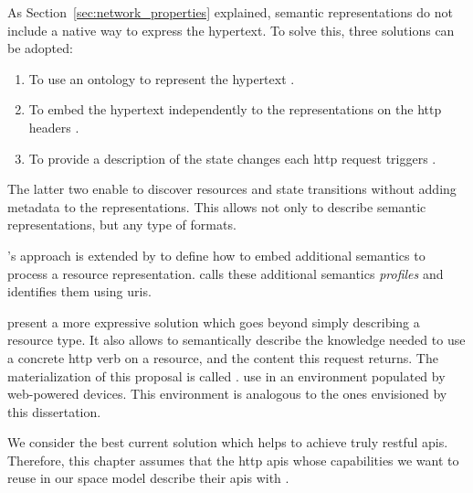 As Section~\ref{sec:network_properties} explained, semantic representations do not include a native way to express the hypertext. %
To solve this, three solutions can be adopted:
\begin{enumerate}
  \item To use an ontology to represent the hypertext \citep{kjernsmo_necessity_2012}.
  \item To embed the hypertext independently to the representations on the \ac{http} headers \citep{mark_web_2010}.
  \item To provide a description of the state changes each \ac{http} request triggers \citep{verborgh_functional_2012,verborgh_ijcs_2014}.
\end{enumerate}


The latter two enable to discover resources and state transitions without adding metadata to the representations.
This allows not only to describe semantic representations, but any type of formats.


\citeauthor{mark_web_2010}'s \citep{mark_web_2010} approach is extended by \citet{erik_profile_2013} to define how to embed additional semantics to process a resource representation.
\citet{erik_profile_2013} calls these additional semantics \emph{profiles} and identifies them using \acsp{uri}.


\citet{verborgh_ijcs_2014} present a more expressive solution which goes beyond simply describing a resource type.
It also allows to semantically describe the knowledge needed to use a concrete \acs{http} verb on a resource, and the content this request returns. %
The materialization of this proposal is called \restdesc{} \citep{verborgh_functional_2012}.
\citet{mayer_semantic_2013} use \restdesc{} in an environment populated by web-powered devices. %
This environment is analogous to the ones envisioned by this dissertation. %


\bigskip


We consider \restdesc{} the best current solution which helps to achieve truly \ac{rest}ful \acsp{api}.
Therefore, this chapter assumes that the \ac{http} \acsp{api} whose capabilities we want to reuse in our space model describe their \acsp{api} with \restdesc{}.


\subsection{\restdesc{}}
\label{sec:restdesc}

